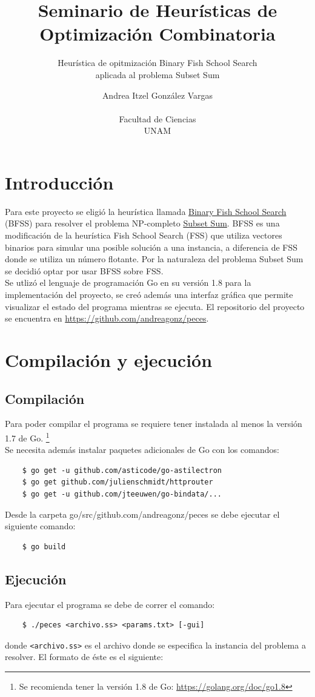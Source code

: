 \documentclass[12pt]{article}
\title{Seminario de Heurísticas de Optimización Combinatoria}
\author{Heurística de opitmización Binary Fish School Search \\ aplicada al problema Subset Sum}
\date{Andrea Itzel González Vargas \\ $\ $ \\ Facultad de Ciencias \\ UNAM}
\begin{document}
\maketitle
\tableofcontents
\newpage

\section{Introducción}
Para este proyecto se eligió la heurística llamada \hyperref[sec:bfss]{Binary Fish School Search} (BFSS) para resolver el problema NP-completo \hyperref[sec:ss]{Subset Sum}. BFSS es una modificación de la heurística Fish School Search (FSS) que utiliza vectores binarios para simular una posible solución a una instancia, a diferencia de FSS donde se utiliza un número flotante. Por la naturaleza del problema Subset Sum se decidió optar por usar BFSS sobre FSS. \\

Se utlizó el lenguaje de programación Go en su versión 1.8 para la implementación del proyecto, se creó además una interfaz gráfica que permite visualizar el estado del programa mientras se ejecuta. El repositorio del proyecto se encuentra en \url{https://github.com/andreagonz/peces}. 

\section{Compilación y ejecución}

\subsection{Compilación}
Para poder compilar el programa se requiere tener instalada al menos la versión 1.7 de Go. \footnote{Se recomienda tener la versión 1.8 de Go: \url{https://golang.org/doc/go1.8}} \\
Se necesita además instalar paquetes adicionales de Go con los comandos:
\begin{verbatim}
    $ go get -u github.com/asticode/go-astilectron
    $ go get github.com/julienschmidt/httprouter
    $ go get -u github.com/jteeuwen/go-bindata/...
\end{verbatim}
Desde la carpeta \textsf{go/src/github.com/andreagonz/peces} se debe ejecutar el siguiente comando:
\begin{verbatim}
    $ go build
\end{verbatim}

\subsection{Ejecución}
Para ejecutar el programa se debe de correr el comando:
\begin{verbatim}
    $ ./peces <archivo.ss> <params.txt> [-gui]
\end{verbatim}
donde \texttt{<archivo.ss>} es el archivo donde se especifica la instancia del problema a resolver. El formato de éste es el siguiente:  \\
\end{document}
